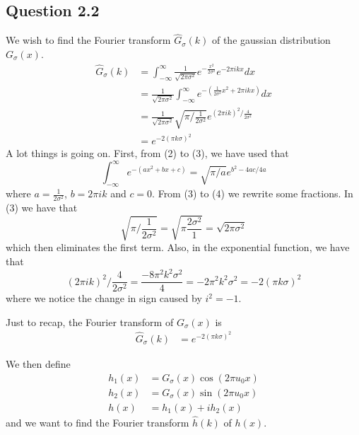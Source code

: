 \documentclass[a4paper, 10pt, final]{article}
\begin{document}
\subsection*{Question 2.2}
We wish to find the Fourier transform $\hat{G}_{\sigma}(k)$ of the
gaussian distribution $G_{\sigma}(x)$.
\begin{align}
    \hat{G}_{\sigma}(k) & = \int_{-\infty}^{\infty}{\frac{1}{\sqrt{2\pi \sigma^{2}}}e^{-\frac{x^2}{2\sigma^2}}e^{-2\pi ikx}dx}\\
    & = \frac{1}{\sqrt{2\pi \sigma^{2}}}\int_{-\infty}^{\infty}{e^{-(\frac{1}{2\sigma^2}x^2 + 2\pi ikx)}dx}\\
    & = \frac{1}{\sqrt{2\pi
    \sigma^{2}}}\sqrt{\pi/\frac{1}{2\sigma^{2}}}e^{(2\pi ik)^2/\frac{4}{2\sigma^2}}\\
    & = e^{-2(\pi k\sigma)^2}
\end{align}
A lot things is going on. First, from (2) to (3), we have used that
\begin{equation}
    \int_{-\infty}^{\infty}e^{-(ax^2+bx+c)} = \sqrt{\pi/a}e^{b^2 - 4ac/4a}
\end{equation}
where $a = \frac{1}{2\sigma^2}$, $b = 2\pi ik$ and $c = 0$. From
(3) to (4) we rewrite some fractions. In (3) we have that
\begin{equation}
    \sqrt{\pi/\frac{1}{2\sigma^{2}}} =
    \sqrt{\pi\frac{2\sigma^2}{1}} = \sqrt{2\pi\sigma^2}
\end{equation}
which then eliminates the first term. Also, in the exponential function,
we have that
\begin{equation}
    (2\pi ik)^2 / \frac{4}{2\sigma^2} = \frac{-8\pi^{2}k^{2}\sigma^2}{4}
    = -2\pi^2 k^2\sigma^2 = -2(\pi k \sigma)^2
\end{equation}
where we notice the change in sign caused by $i^2 = -1$.

Just to recap, the Fourier transform of $G_{\sigma}(x)$ is
\begin{align}
    \hat{G}_{\sigma}(k) & = e^{-2(\pi k\sigma)^2}
\end{align}

We then define
\begin{align}
    h_1(x) & = G_{\sigma}(x)\cos(2\pi u_0x)\\
    h_2(x) & = G_{\sigma}(x)\sin(2\pi u_0x)\\
    h(x) & = h_1(x) + ih_2(x)
\end{align}
and we want to find the Fourier transform $\hat{h}(k)$ of $h(x)$.
\end{document}
